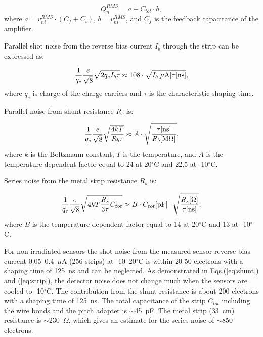 \begin{equation}
  Q^{RMS}_{n}=a+C_{tot}{\cdot}b
  \label{eq:qn},
\end{equation}
where $a = v^{RMS}_{ni} \cdot (C_{f} + C_{i})$, $b = v^{RMS}_{ni}$, and $C_f$ is the feedback capacitance of the
amplifier.

Parallel shot noise from the reverse bias current $I_b$ through the strip can be expressed as:

\begin{equation}
  \frac{1}{q_e}\frac{e}{\sqrt{8}}\sqrt{2q_eI_b\tau} \approx 108\cdot\sqrt{I_b[\mu{\rm A}]\tau [{\rm ns}]}
  \label{eq:bias},
\end{equation}
where $q_e$ is charge of the charge carriers and $\tau$ is the characteristic shaping time.

Parallel noise from shunt resistance $R_b$ is:

\begin{equation}
  \frac{1}{q_e}\frac{e}{\sqrt{8}}\sqrt{\frac{4kT}{R_b\tau}} \approx
  A\cdot\sqrt{\frac{\tau [{\rm ns}]}{R_b[{\rm M} \Omega]}}
  \label{eq:shunt},
\end{equation}
where $k$ is the Boltzmann constant, $T$ is the temperature, and $A$ is the temperature-dependent factor equal
to 24 at 20$^\circ$C and 22.5 at -10$^\circ$C.

Series noise from the metal strip resistance $R_s$ is:

\begin{equation}
  \frac{1}{q_e}\frac{e}{\sqrt{8}}\sqrt{4kT\frac{R_s}{3\tau}C_{tot}} \approx
  B\cdot C_{tot}[{\rm pF}]\cdot\sqrt{\frac{R_s[\Omega]}{\tau [{\rm ns}]}}
  \label{eq:strip},
\end{equation}
where $B$ is the temperature-dependent factor equal to 14 at 20$^\circ$C and 13 at -10$^\circ$C.

For non-irradiated sensors the shot noise from the measured sensor reverse bias current 0.05--0.4~$\mu$A
(256 strips) at -10--20$^\circ$C is within 20-50 electrons with a shaping time of 125~ns and can be neglected.
As demonstrated in Eqs.(\ref{eq:shunt}) and (\ref{eq:strip}), the detector noise does not change much when the
sensors are cooled to -10$^\circ$C. The contribution from the shunt resistance is about 200 electrons with a
shaping time of 125~ns. The total capacitance of the strip $C_{tot}$ including the wire bonds and the pitch adapter
is $\sim$45~pF. The metal strip (33~cm) resistance is $\sim$230~$\Omega$, which gives an estimate for the
series noise of $\sim$850 electrons.

